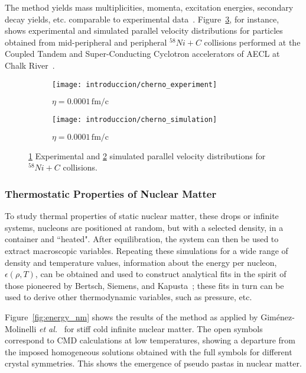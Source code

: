 The method yields mass multiplicities, momenta, excitation energies,
secondary decay yields, etc. comparable to experimental
data~\cite{belkacem_searching_1996,chernomoretz_quasiclassical_2002}.
Figure~\ref{fig:distribution}, for instance, shows experimental and
simulated parallel velocity distributions for particles obtained from
mid-peripheral and peripheral ${}^{58}Ni+C$ collisions performed at
the Coupled Tandem and Super-Conducting Cyclotron accelerators of AECL
at Chalk River~\cite{chernomoretz_quasiclassical_2002}.

\begin{figure}[h]
  \begin{subfigure}[h!]{\columnwidth}
    \texttt{[image: introduccion/cherno\_experiment]}
    \caption{$\eta = 0.0001\,\text{fm/c}$}
    \label{sfig:exp}
  \end{subfigure}
  \begin{subfigure}[h!]{\columnwidth}
    \texttt{[image: introduccion/cherno\_simulation]}
    \caption{$\eta = 0.0001\,\text{fm/c}$}
    \label{sfig:sim}
  \end{subfigure}
  \centering
  \caption{\ref{sfig:exp} Experimental and \ref{sfig:sim} simulated
    parallel velocity distributions for ${}^{58}Ni+C$ collisions.}
  \label{fig:distribution}
\end{figure}


\subsubsection{Thermostatic Properties of Nuclear Matter} To study
thermal properties of static nuclear matter, these drops or infinite
systems, nucleons are positioned at random, but with a selected
density, in a container and ``heated". After equilibration, the system
can then be used to extract macroscopic variables. Repeating these
simulations for a wide range of density and temperature values,
information about the energy per nucleon, $\epsilon(\rho,T)$, can be
obtained and used to construct analytical fits in the spirit of those
pioneered by Bertsch, Siemens, and Kapusta~\cite{bertsch_nuclear_1983,
  kapusta_deuteron_1984, lopez_nuclear_1984}; these fits in turn can
be used to derive other thermodynamic variables, such as pressure,
etc.

Figure~\ref{fig:energy_nm} shows the results of the method as applied
by Gim\'enez-Molinelli \emph{et
  al.}~\cite{gimenez_molinelli_simulations_2014} for stiff cold
infinite nuclear matter. The open symbols correspond to CMD
calculations at low temperatures, showing a departure from the imposed
homogeneous solutions obtained with the full symbols for different
crystal symmetries. This shows the emergence of pseudo pastas in
nuclear matter.

